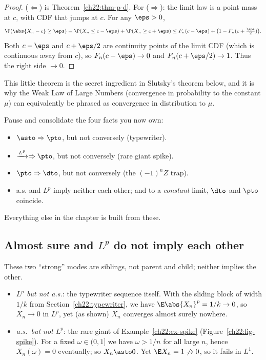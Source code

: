 \begin{proof}
($\Leftarrow$) is Theorem~\ref{ch22:thm-p-d}. For ($\Rightarrow$): the limit law is a
point mass at $c$, with CDF that jumps at $c$. For any $\eps>0$,
\[
  \P(\abs{X_n - c}\ge\eps)
  = \P(X_n\le c-\eps) + \P(X_n\ge c+\eps)
  \le F_n(c-\eps) + \big(1-F_n(c+\tfrac{\eps}{2})\big).
\]
Both $c-\eps$ and $c+\eps/2$ are continuity points of the limit CDF (which is
continuous away from $c$), so $F_n(c-\eps)\to0$ and $F_n(c+\eps/2)\to1$. Thus the
right side $\to0$.
\end{proof}

This little theorem is the secret ingredient in Slutsky's theorem below, and it is
why the Weak Law of Large Numbers (convergence in probability to the constant $\mu$)
can equivalently be phrased as convergence in distribution to $\mu$.

\begin{recoverybox}
Pause and consolidate the four facts you now own:
\begin{itemize}
\item $\asto \Rightarrow \pto$, but not conversely (typewriter).
\item $\xrightarrow{L^p} \Rightarrow \pto$, but not conversely (rare giant spike).
\item $\pto \Rightarrow \dto$, but not conversely (the $(-1)^nZ$ trap).
\item a.s. and $L^p$ imply neither each other; and to a \emph{constant} limit, $\dto$
      and $\pto$ coincide.
\end{itemize}
Everything else in the chapter is built from these.
\end{recoverybox}

\subsection{Almost sure and \texorpdfstring{$L^p$}{Lp} do not imply each other}
\label{ch22:as-vs-lp}

These two ``strong'' modes are siblings, not parent and child; neither implies the
other.

\begin{itemize}
\item \emph{$L^p$ but not a.s.}: the typewriter sequence itself. With the sliding
      block of width $1/k$ from Section~\ref{ch22:typewriter}, we have
      $\E\abs{X_n}^p = 1/k \to 0$, so $X_n\to0$ in $L^p$, yet (as shown) $X_n$
      converges almost surely nowhere.
\item \emph{a.s.\ but not $L^p$}: the rare giant of Example~\ref{ch22:ex-spike}
      (Figure~\ref{ch22:fig-spike}). For a
      fixed $\omega\in(0,1]$ we have $\omega>1/n$ for all large $n$, hence
      $X_n(\omega)=0$ eventually; so $X_n\asto0$. Yet $\E X_n = 1\not\to0$, so it
      fails in $L^1$.
\end{itemize}

